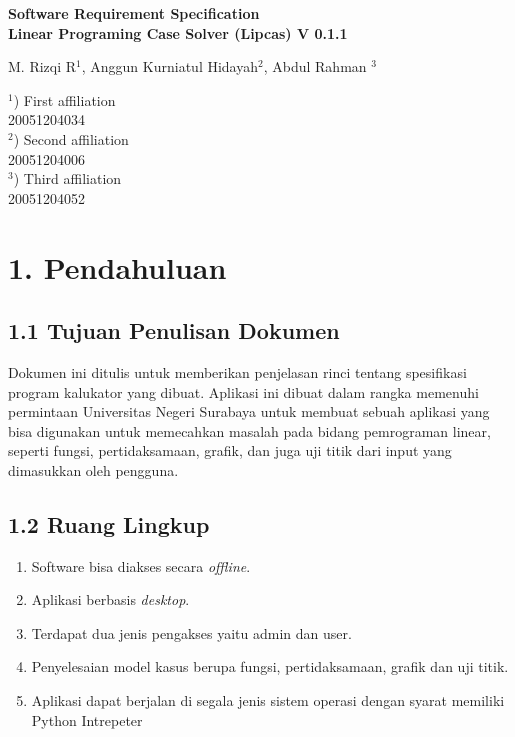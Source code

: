 \documentclass[a4paper]{article}
\begin{document}

\Large
 \begin{center}
    \textbf{Software Requirement Specification\\
        Linear Programing Case Solver (Lipcas)
        V 0.1.1
    }

\hspace{10pt}

\large
M. Rizqi R$^1$, Anggun Kurniatul Hidayah$^2$,
Abdul Rahman $^3$ \\

\hspace{10pt}

\small  
$^1$) First affiliation\\
20051204034\\
$^2$) Second affiliation\\
20051204006\\
$^3$) Third affiliation\\
20051204052

\date{today}

\end{center}

\hspace{10pt}

\normalsize
\section*{1. Pendahuluan}
    \subsection*{1.1 Tujuan Penulisan Dokumen}
    \noindent Dokumen ini ditulis untuk memberikan penjelasan rinci
    tentang spesifikasi program kalukator yang dibuat.
    Aplikasi ini dibuat dalam rangka memenuhi permintaan
    Universitas Negeri Surabaya untuk membuat sebuah aplikasi 
    yang bisa digunakan untuk memecahkan masalah pada bidang 
    pemrograman linear, seperti fungsi, pertidaksamaan,
    grafik, dan juga uji titik dari input yang dimasukkan
    oleh pengguna.
    \subsection*{1.2 Ruang Lingkup}
    \noindent 
    \begin{enumerate}
        \item Software bisa diakses secara \textit{offline}.
        \item Aplikasi berbasis \textit{desktop}.
        \item Terdapat dua jenis pengakses yaitu admin dan user.
        \item Penyelesaian model kasus berupa fungsi, pertidaksamaan, grafik dan uji titik.
        \item Aplikasi dapat berjalan di segala jenis sistem operasi dengan syarat memiliki Python Intrepeter
    \end{enumerate}
\end{document}
